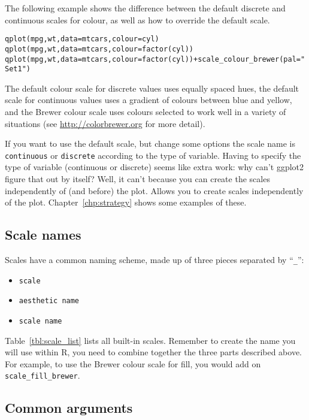 The following example shows the difference between the default discrete and continuous scales for colour, as well as how to override the default scale.

\begin{alltt}
  qplot(mpg, wt, data=mtcars, colour=cyl)
  qplot(mpg, wt, data=mtcars, colour=factor(cyl))
  qplot(mpg, wt, data=mtcars, colour=factor(cyl)) + scale_colour_brewer(pal="Set1")
\end{alltt}

The default colour scale for discrete values uses equally spaced hues, the default scale for continuous values uses a gradient of colours between blue and yellow, and the Brewer colour scale uses colours selected to work well in a variety of situations (see \url{http://colorbrewer.org} for more detail).

If you want to use the default scale, but change some options the scale name is {\tt continuous} or {\tt discrete} according to the type of variable.  Having to specify the type of variable (continuous or discrete) seems like extra work: why can't ggplot2 figure that out by itself?  Well, it can't because you can create the scales independently of (and before) the plot.  Allows you to create scales independently of the plot.  Chapter~\ref{chp:strategy} shows some examples of these.

\subsection{Scale names}
\label{sub:scale_names}

Scales have a common naming scheme, made up of three pieces separated by ``{\tt \_}'':

\begin{itemize}
  \item {\tt scale}
  \item {\tt aesthetic name}
  \item {\tt scale name}
\end{itemize}

Table~\ref{tbl:scale_list} lists all built-in scales.  Remember to create the name you will use within R, you need to combine together the three parts described above.  For example, to use the Brewer colour scale for fill, you would add on {\tt scale\_fill\_brewer}.  



\subsection{Common arguments}
\label{sub:scale_arguments}

